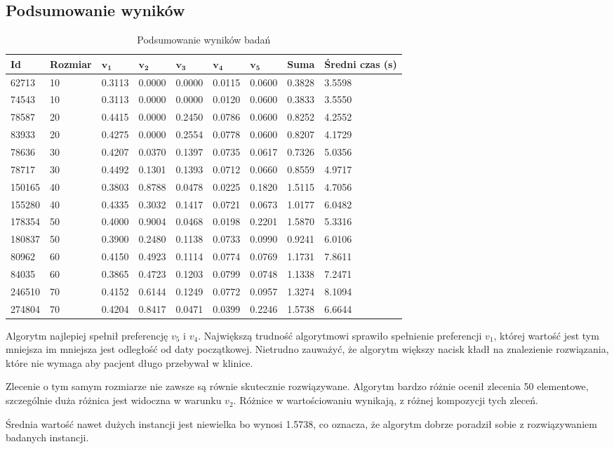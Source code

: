 \subsection{Podsumowanie wyników}
\begin{table}[H]
\centering
\begin{tabularx}{1\textwidth}{ | X | X | l | l | l | l | l | l | X | }
\hline
\bfseries Id & \bfseries Rozmiar & $\mathbf{v_1}$ & $\mathbf{v_2}$ & $\mathbf{v_3}$ & $\mathbf{v_4}$ & $\mathbf{v_5}$ & \bfseries Suma & \bfseries Średni czas (s) \\
\hline
62713 & 10 & 0.3113 & 0.0000 & 0.0000 & 0.0115 & 0.0600 & 0.3828 & 3.5598 \\
\hline
74543 & 10 & 0.3113 & 0.0000 & 0.0000 & 0.0120 & 0.0600 & 0.3833 & 3.5550 \\
\hline
78587 & 20 & 0.4415 & 0.0000 & 0.2450 & 0.0786 & 0.0600 & 0.8252 & 4.2552 \\
\hline
83933 & 20 & 0.4275 & 0.0000 & 0.2554 & 0.0778 & 0.0600 & 0.8207 & 4.1729 \\
\hline
78636 & 30 & 0.4207 & 0.0370 & 0.1397 & 0.0735 & 0.0617 & 0.7326 & 5.0356 \\
\hline
78717 & 30 & 0.4492 & 0.1301 & 0.1393 & 0.0712 & 0.0660 & 0.8559 & 4.9717 \\
\hline
150165 & 40 & 0.3803 & 0.8788 & 0.0478 & 0.0225 & 0.1820 & 1.5115 & 4.7056 \\
\hline
155280 & 40 & 0.4335 & 0.3032 & 0.1417 & 0.0721 & 0.0673 & 1.0177 & 6.0482 \\
\hline
178354 & 50 & 0.4000 & 0.9004 & 0.0468 & 0.0198 & 0.2201 & 1.5870 & 5.3316 \\
\hline
180837 & 50 & 0.3900 & 0.2480 & 0.1138 & 0.0733 & 0.0990 & 0.9241 & 6.0106 \\
\hline
80962 & 60 & 0.4150 & 0.4923 & 0.1114 & 0.0774 & 0.0769 & 1.1731 & 7.8611 \\
\hline
84035 & 60 & 0.3865 & 0.4723 & 0.1203 & 0.0799 & 0.0748 & 1.1338 & 7.2471 \\
\hline
246510 & 70 & 0.4152 & 0.6144 & 0.1249 & 0.0772 & 0.0957 & 1.3274 & 8.1094 \\
\hline
274804 & 70 & 0.4204 & 0.8417 & 0.0471 & 0.0399 & 0.2246 & 1.5738 & 6.6644 \\
\hline
\end{tabularx}
\caption{Podsumowanie wyników badań}
\end{table}
Algorytm najlepiej spełnił preferencję $v_5$ i $v_4$. Największą trudność
algorytmowi sprawiło spełnienie preferencji $v_1$, której wartość jest tym mniejsza im
mniejsza jest odległość od daty początkowej. Nietrudno zauważyć, że algorytm
większy nacisk kładł na znalezienie rozwiązania, które nie wymaga aby
pacjent długo przebywał w klinice.

Zlecenie o tym samym rozmiarze nie zawsze są równie skutecznie rozwiązywane. Algorytm bardzo różnie ocenił
zlecenia 50 elementowe, szczególnie duża różnica jest widoczna w warunku $v_2$. Różnice w wartościowaniu wynikają, z różnej
kompozycji tych zleceń.

Średnia wartość nawet dużych instancji jest niewielka bo wynosi 1.5738, co
oznacza, że algorytm dobrze poradził sobie z rozwiązywaniem badanych instancji.
